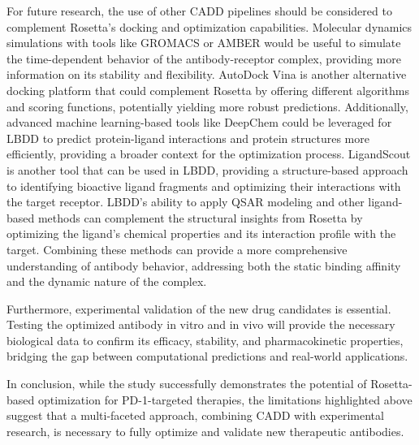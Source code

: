 \documentclass[11pt]{article}
\begin{document}
For future research, the use of other CADD pipelines should be considered to complement Rosetta's docking and optimization capabilities. Molecular dynamics simulations with tools like GROMACS \cite{pall2020} or AMBER \cite{salomonferrer2013} would be useful to simulate the time-dependent behavior of the antibody-receptor complex, providing more information on its stability and flexibility. AutoDock Vina \cite{eberhardt2021} is another alternative docking platform that could complement Rosetta by offering different algorithms and scoring functions, potentially yielding more robust predictions. Additionally, advanced machine learning-based tools like DeepChem \cite{Ramsundar2019} could be leveraged for LBDD to predict protein-ligand interactions and protein structures more efficiently, providing a broader context for the optimization process. LigandScout \cite{wolber2006} is another tool that can be used in LBDD, providing a structure-based approach to identifying bioactive ligand fragments and optimizing their interactions with the target receptor. LBDD’s ability to apply QSAR modeling and other ligand-based methods can complement the structural insights from Rosetta by optimizing the ligand's chemical properties and its interaction profile with the target. Combining these methods can provide a more comprehensive understanding of antibody behavior, addressing both the static binding affinity and the dynamic nature of the complex.

Furthermore, experimental validation of the new drug candidates is essential. Testing the optimized antibody in vitro and in vivo will provide the necessary biological data to confirm its efficacy, stability, and pharmacokinetic properties, bridging the gap between computational predictions and real-world applications.

In conclusion, while the study successfully demonstrates the potential of Rosetta-based optimization for PD-1-targeted therapies, the limitations highlighted above suggest that a multi-faceted approach, combining CADD with experimental research, is necessary to fully optimize and validate new therapeutic antibodies.
\end{document}
